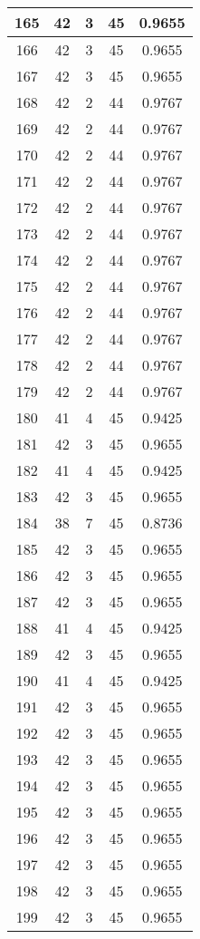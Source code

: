 \documentclass[letterpaper, 12pt]{article}
\begin{document}
\begin{longtable}{|c|c|c|c|c|}
\hline
165 & 42 & 3 & 45 & 0.9655 \\
\hline
166 & 42 & 3 & 45 & 0.9655 \\
\hline
167 & 42 & 3 & 45 & 0.9655 \\
\hline
168 & 42 & 2 & 44 & 0.9767 \\
\hline
169 & 42 & 2 & 44 & 0.9767 \\
\hline
170 & 42 & 2 & 44 & 0.9767 \\
\hline
171 & 42 & 2 & 44 & 0.9767 \\
\hline
172 & 42 & 2 & 44 & 0.9767 \\
\hline
173 & 42 & 2 & 44 & 0.9767 \\
\hline
174 & 42 & 2 & 44 & 0.9767 \\
\hline
175 & 42 & 2 & 44 & 0.9767 \\
\hline
176 & 42 & 2 & 44 & 0.9767 \\
\hline
177 & 42 & 2 & 44 & 0.9767 \\
\hline
178 & 42 & 2 & 44 & 0.9767 \\
\hline
179 & 42 & 2 & 44 & 0.9767 \\
\hline
180 & 41 & 4 & 45 & 0.9425 \\
\hline
181 & 42 & 3 & 45 & 0.9655 \\
\hline
182 & 41 & 4 & 45 & 0.9425 \\
\hline
183 & 42 & 3 & 45 & 0.9655 \\
\hline
184 & 38 & 7 & 45 & 0.8736 \\
\hline
185 & 42 & 3 & 45 & 0.9655 \\
\hline
186 & 42 & 3 & 45 & 0.9655 \\
\hline
187 & 42 & 3 & 45 & 0.9655 \\
\hline
188 & 41 & 4 & 45 & 0.9425 \\
\hline
189 & 42 & 3 & 45 & 0.9655 \\
\hline
190 & 41 & 4 & 45 & 0.9425 \\
\hline
191 & 42 & 3 & 45 & 0.9655 \\
\hline
192 & 42 & 3 & 45 & 0.9655 \\
\hline
193 & 42 & 3 & 45 & 0.9655 \\
\hline
194 & 42 & 3 & 45 & 0.9655 \\
\hline
195 & 42 & 3 & 45 & 0.9655 \\
\hline
196 & 42 & 3 & 45 & 0.9655 \\
\hline
197 & 42 & 3 & 45 & 0.9655 \\
\hline
198 & 42 & 3 & 45 & 0.9655 \\
\hline
199 & 42 & 3 & 45 & 0.9655 \\
\hline
\end{longtable}
\end{document}
